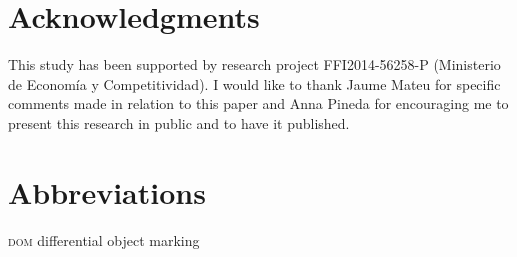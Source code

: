 \documentclass[output=paper,colorlinks,citecolor=brown,modfonts,nonflat]{langsci/langscibook}
\begin{document}
\section*{Acknowledgments} This study has been supported by research project FFI2014-56258-P ({Ministerio de Economía y Competitividad}). I would like to thank Jaume Mateu for specific comments made in relation to this paper and Anna Pineda for encouraging me to present this research in public and to have it published.

\section*{Abbreviations}
\textsc{dom} differential object marking

\sloppy\printbibliography[heading=subbibliography,notkeyword=this]
\end{document}
